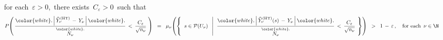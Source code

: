 \begin{theorem}
for each \,$\varepsilon > 0$,\, there exists \,$C_{\varepsilon} > 0$\, such that
\begin{equation*}
P\!\left(\,
    \dfrac{
        {\color{white}.}
        \left\vert\,\widehat{Y}^{\textnormal{(HT)}}_{\nu} \,-\, Y_{\nu}\,\right\vert
        {\color{white}.}
        }{
        \overset{{\color{white}.}}{N_{\nu}}
        }
    \,<\,
    \dfrac{C_{\varepsilon}}{\sqrt{n_{\nu}}}
    \;\right)
\;\; = \;\;
\mu_{\nu}\!\left(\left\{\;\;
    s \in \mathcal{P}(U_{\nu})
    \;\;\left\vert\;\;
    \dfrac{
        {\color{white}.}
        \left\vert\,\widehat{Y}^{\textnormal{(HT)}}_{\nu}(s) \,-\, Y_{\nu}\,\right\vert
        {\color{white}.}
        }{
        \overset{{\color{white}.}}{N_{\nu}}
        }
    \,<\,
    \dfrac{C_{\varepsilon}}{\sqrt{n_{\nu}}}
    \right.
    \;\right\}\right)
\;\; > \;\;
    1 \,-\, \varepsilon\,,
\quad
\textnormal{for each \,$\nu \in \N$}
\end{equation*}
\end{theorem}

